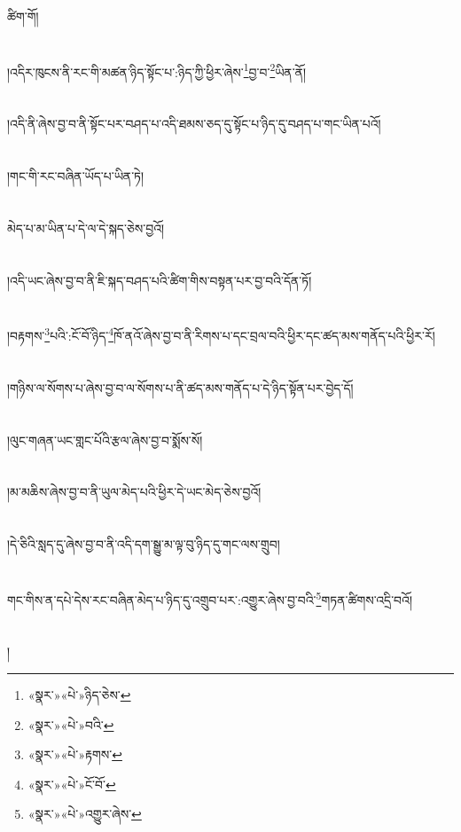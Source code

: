 ཚིག་གོ།\chapter{ }།འདིར་ཁུངས་ནི་རང་གི་མཚན་ཉིད་སྟོང་པ་:ཉིད་ཀྱི་ཕྱིར་ཞེས་\footnote{«སྣར་»«པེ་»ཉིད་ཅེས་}བྱ་བ་\footnote{«སྣར་»«པེ་»བའི་}ཡིན་ནོ།\chapter{ }།འདི་ནི་ཞེས་བྱ་བ་ནི་སྟོང་པར་བཤད་པ་འདི་ཐམས་ཅད་དུ་སྟོང་པ་ཉིད་དུ་བཤད་པ་གང་ཡིན་པའོ།\chapter{ }།གང་གི་རང་བཞིན་ཡོད་པ་ཡིན་ཏེ།\chapter{ }མེད་པ་མ་ཡིན་པ་དེ་ལ་དེ་སྐད་ཅེས་བྱའོ།\chapter{ }།འདི་ཡང་ཞེས་བྱ་བ་ནི་ཇི་སྐད་བཤད་པའི་ཚིག་གིས་བསྟན་པར་བྱ་བའི་དོན་ཏོ།\chapter{ }།བརྟགས་\footnote{«སྣར་»«པེ་»རྟགས་}པའི་:ངོ་བོ་ཉིད་\footnote{«སྣར་»«པེ་»ངོ་བོ་}ཁོ་ནའོ་ཞེས་བྱ་བ་ནི་རིགས་པ་དང་བྲལ་བའི་ཕྱིར་དང་ཚད་མས་གནོད་པའི་ཕྱིར་རོ།\chapter{ }།གཉིས་ལ་སོགས་པ་ཞེས་བྱ་བ་ལ་སོགས་པ་ནི་ཚད་མས་གནོད་པ་དེ་ཉིད་སྟོན་པར་བྱེད་དོ།\chapter{ }།ལུང་གཞན་ཡང་གླང་པོའི་རྩལ་ཞེས་བྱ་བ་སྨོས་སོ།\chapter{ }།མ་མཆིས་ཞེས་བྱ་བ་ནི་ཡུལ་མེད་པའི་ཕྱིར་དེ་ཡང་མེད་ཅེས་བྱའོ།\chapter{ }།དེ་ཅིའི་སླད་དུ་ཞེས་བྱ་བ་ནི་འདི་དག་སྒྱུ་མ་ལྟ་བུ་ཉིད་དུ་གང་ལས་གྲུབ།\chapter{ }གང་གིས་ན་དཔེ་དེས་རང་བཞིན་མེད་པ་ཉིད་དུ་འགྲུབ་པར་:འགྱུར་ཞེས་བྱ་བའི་\footnote{«སྣར་»«པེ་»འགྱུར་ཞེས་}གཏན་ཚིགས་འདྲི་བའོ།\chapter{ }།
